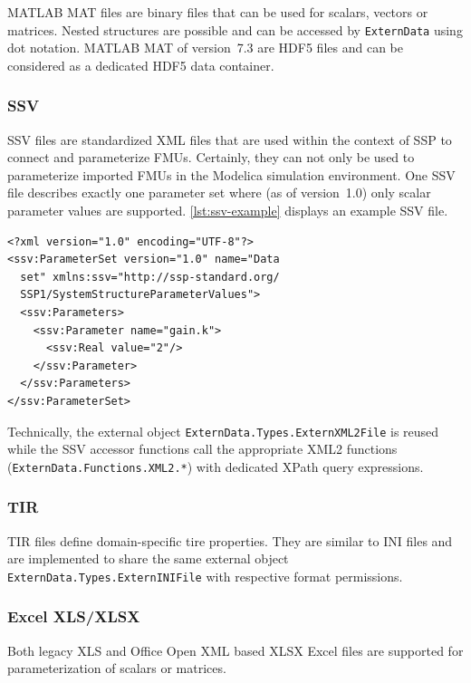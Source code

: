 \documentclass{modelica}
\newcommand{\modelica}[1]{\lstinline[language=modelica]|#1|}
\begin{document}
MATLAB MAT files are binary files that can be used for scalars, vectors or matrices.
Nested structures are possible and can be accessed by \modelica{ExternData} using dot notation.
MATLAB MAT of version~7.3 are HDF5 files and can be considered as a dedicated HDF5 data container.

\subsubsection*{SSV}

SSV files are standardized XML files that are used within the context of SSP to connect and parameterize FMUs.
Certainly, they can not only be used to parameterize imported FMUs in the Modelica simulation environment.
One SSV file describes exactly one parameter set where (as of version~1.0) only scalar parameter values are supported.
\autoref{lst:ssv-example} displays an example SSV file.

\begin{lstlisting}[caption=Example SSV file, label=lst:ssv-example]
<?xml version="1.0" encoding="UTF-8"?>
<ssv:ParameterSet version="1.0" name="Data
  set" xmlns:ssv="http://ssp-standard.org/
  SSP1/SystemStructureParameterValues">
  <ssv:Parameters>
    <ssv:Parameter name="gain.k">
      <ssv:Real value="2"/>
    </ssv:Parameter>
  </ssv:Parameters>
</ssv:ParameterSet>
\end{lstlisting}

Technically, the external object \modelica{ExternData.Types.ExternXML2File} is reused while the SSV accessor functions call the appropriate XML2 functions (\modelica{ExternData.Functions.XML2.*}) with dedicated XPath query expressions.

\subsubsection*{TIR}

TIR files define domain-specific tire properties.
They are similar to INI files and are implemented to share the same external object \modelica{ExternData.Types.ExternINIFile} with respective format permissions.

\subsubsection*{Excel XLS/XLSX}

Both legacy XLS and Office Open XML based XLSX Excel files are supported for parameterization of scalars or matrices.
\end{document}
